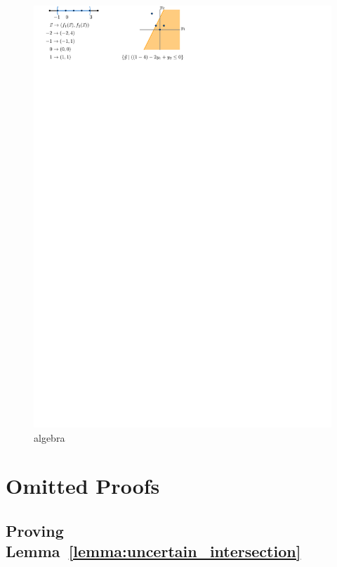 \documentclass[UKenglish]{lipics-v2019}
\begin{document}
\begin{figure}[h]
    \centering
    \includegraphics{../algebraic}
    \caption{algebra}
    \label{fig:algebraic}
\end{figure}

\section{Omitted Proofs}
\label{App:Omitted_Proofs}

\subsection{Proving Lemma~\ref{lemma:uncertain_intersection}}
\end{document}
